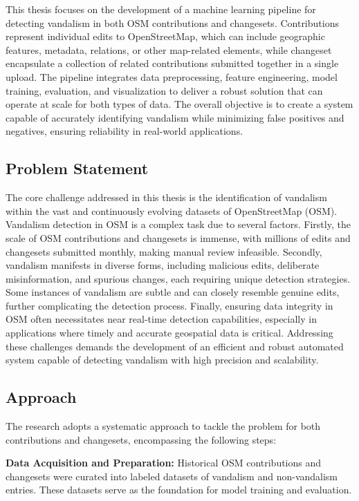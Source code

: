 \documentclass[
    13pt, %
    a4paper, %
    twoside, 
    DIV14, %
    listof=totoc, %
    bibliography=totoc, %
    index=totoc, %
    headsepline
]{scrreprt}
\begin{document}
This thesis focuses on the development of a machine learning pipeline for detecting vandalism in both OSM contributions and changesets. Contributions represent individual edits to OpenStreetMap, which can include geographic features, metadata, relations, or other map-related elements, while changeset encapsulate a collection of related contributions submitted together in a single upload. The pipeline integrates data preprocessing, feature engineering, model training, evaluation, and visualization to deliver a robust solution that can operate at scale for both types of data. The overall objective is to create a system capable of accurately identifying vandalism while minimizing false positives and negatives, ensuring reliability in real-world applications.

\subsection*{Problem Statement}

The core challenge addressed in this thesis is the identification of vandalism within the vast and continuously evolving datasets of OpenStreetMap (OSM). Vandalism detection in OSM is a complex task due to several factors. Firstly, the scale of OSM contributions and changesets is immense, with millions of edits and changesets submitted monthly, making manual review infeasible. Secondly, vandalism manifests in diverse forms, including malicious edits, deliberate misinformation, and spurious changes, each requiring unique detection strategies. Some instances of vandalism are subtle and can closely resemble genuine edits, further complicating the detection process. Finally, ensuring data integrity in OSM often necessitates near real-time detection capabilities, especially in applications where timely and accurate geospatial data is critical. Addressing these challenges demands the development of an efficient and robust automated system capable of detecting vandalism with high precision and scalability.

\subsection*{Approach}

The research adopts a systematic approach to tackle the problem for both contributions and changesets, encompassing the following steps:

\noindent\textbf{Data Acquisition and Preparation:} Historical OSM contributions and changesets were curated into labeled datasets of vandalism and non-vandalism entries. These datasets serve as the foundation for model training and evaluation.
\end{document}
